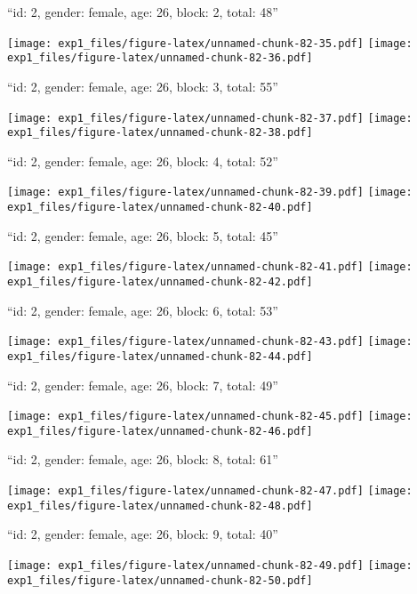 \documentclass[11pt,,]{article}
\begin{document}
``id: 2, gender: female, age: 26, block: 2, total: 48''

\texttt{[image: exp1\_files/figure-latex/unnamed-chunk-82-35.pdf]}
\texttt{[image: exp1\_files/figure-latex/unnamed-chunk-82-36.pdf]}

\newpage
[1] 

``id: 2, gender: female, age: 26, block: 3, total: 55''

\texttt{[image: exp1\_files/figure-latex/unnamed-chunk-82-37.pdf]}
\texttt{[image: exp1\_files/figure-latex/unnamed-chunk-82-38.pdf]}

\newpage
[1] 

``id: 2, gender: female, age: 26, block: 4, total: 52''

\texttt{[image: exp1\_files/figure-latex/unnamed-chunk-82-39.pdf]}
\texttt{[image: exp1\_files/figure-latex/unnamed-chunk-82-40.pdf]}

\newpage
[1] 

``id: 2, gender: female, age: 26, block: 5, total: 45''

\texttt{[image: exp1\_files/figure-latex/unnamed-chunk-82-41.pdf]}
\texttt{[image: exp1\_files/figure-latex/unnamed-chunk-82-42.pdf]}

\newpage
[1] 

``id: 2, gender: female, age: 26, block: 6, total: 53''

\texttt{[image: exp1\_files/figure-latex/unnamed-chunk-82-43.pdf]}
\texttt{[image: exp1\_files/figure-latex/unnamed-chunk-82-44.pdf]}

\newpage
[1] 

``id: 2, gender: female, age: 26, block: 7, total: 49''

\texttt{[image: exp1\_files/figure-latex/unnamed-chunk-82-45.pdf]}
\texttt{[image: exp1\_files/figure-latex/unnamed-chunk-82-46.pdf]}

\newpage
[1] 

``id: 2, gender: female, age: 26, block: 8, total: 61''

\texttt{[image: exp1\_files/figure-latex/unnamed-chunk-82-47.pdf]}
\texttt{[image: exp1\_files/figure-latex/unnamed-chunk-82-48.pdf]}

\newpage
[1] 

``id: 2, gender: female, age: 26, block: 9, total: 40''

\texttt{[image: exp1\_files/figure-latex/unnamed-chunk-82-49.pdf]}
\texttt{[image: exp1\_files/figure-latex/unnamed-chunk-82-50.pdf]}

\newpage
[1] 
\end{document}
